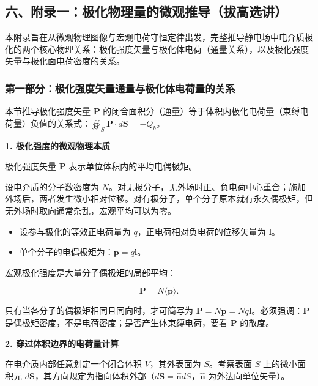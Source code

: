 \subsection{六、附录一：极化物理量的微观推导（拔高选讲）}\label{m3:ux516dux9644ux5f55ux4e00ux6781ux5316ux7269ux7406ux91cfux7684ux5faeux89c2ux63a8ux5bfcux62d4ux9ad8ux9009ux8bb2}

本附录旨在从微观物理图像与宏观电荷守恒定律出发，完整推导静电场中电介质极化的两个核心物理关系：极化强度矢量与极化体电荷（通量关系），以及极化强度矢量与极化面电荷密度的关系。

\subsubsection{第一部分：极化强度矢量通量与极化体电荷量的关系}\label{m3:ux7b2cux4e00ux90e8ux5206ux6781ux5316ux5f3aux5ea6ux77e2ux91cfux901aux91cfux4e0eux6781ux5316ux4f53ux7535ux8377ux91cfux7684ux5173ux7cfb}

本节推导极化强度矢量 \(\mathbf{P}\)
的闭合面积分（通量）等于体积内极化电荷量（束缚电荷量）负值的关系式：\(\oiint_S \mathbf{P} \cdot d\mathbf{S} = -Q_b\)。

\textbf{1. 极化强度的微观物理本质}

极化强度矢量 \(\mathbf{P}\) 表示单位体积内的平均电偶极矩。

设电介质的分子数密度为
\(N\)。对无极分子，无外场时正、负电荷中心重合；施加外场后，两者发生微小相对位移。对有极分子，单个分子原本就有永久偶极矩，但无外场时取向通常杂乱，宏观平均可以为零。

\begin{itemize}
\tightlist
\item
  设参与极化的等效正电荷量为 \(q\)，正电荷相对负电荷的位移矢量为
  \(\mathbf{l}\)。
\item
  单个分子的电偶极矩为：\(\mathbf{p} = q\mathbf{l}\)。
\end{itemize}

宏观极化强度是大量分子偶极矩的局部平均：

\[
\mathbf P=N\langle\mathbf p\rangle.
\]

只有当各分子的偶极矩相同且同向时，才可简写为
\(\mathbf P=N\mathbf p=Nq\mathbf l\)。必须强调：\(\mathbf P\)
是偶极矩密度，不是电荷密度；是否产生体束缚电荷，要看 \(\mathbf P\)
的散度。

\textbf{2. 穿过体积边界的电荷量计算}

在电介质内部任意划定一个闭合体积 \(V\)，其外表面为 \(S\)。考察表面 \(S\)
上的微小面积元
\(d\mathbf{S}\)，其方向规定为指向体积外部（\(d\mathbf{S} = \mathbf{\hat{n}} dS\)，\(\mathbf{\hat{n}}\)
为外法向单位矢量）。

